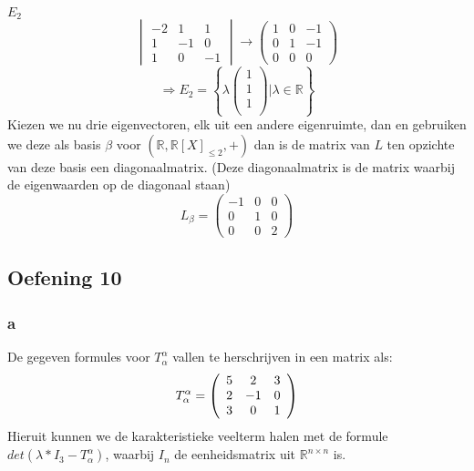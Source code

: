 \documentclass[lineaire_algebra_oplossingen.tex]{subfiles}
\begin{document}
\emph{$E_2$}\\
\[
\begin{vmatrix}
-2 & 1 & 1\\
1 & -1& 0\\
1 & 0 & -1
\end{vmatrix}
\rightarrow
\begin{pmatrix}
1 & 0 & -1\\
0 & 1 & -1\\
0 & 0 & 0
\end{pmatrix}
\]
\[
\Rightarrow E_2 = 
\left\{ 
\lambda
\begin{pmatrix}
1\\1\\1\\
\end{pmatrix}
| \lambda \in \mathbb{R}
\right\}
\]
Kiezen we nu drie eigenvectoren, elk uit een andere eigenruimte, dan en gebruiken we deze als basis $\beta$ voor $(\mathbb{R},\mathbb{R}[X]_{\le 2},+)$ dan is de matrix van $L$ ten opzichte van deze basis een diagonaalmatrix.
(Deze diagonaalmatrix is de matrix waarbij de eigenwaarden op de diagonaal staan)
\[
L_\beta = 
\begin{pmatrix}
-1 & 0 & 0\\
 0 & 1 & 0\\
 0 & 0 & 2
\end{pmatrix}
\]


\subsection{Oefening 10}

\subsubsection*{a}
De gegeven formules voor $T^\alpha_\alpha$ vallen te herschrijven in een matrix als:
\[
T^\alpha_\alpha = \left(
\begin{array}{c c c}
5 & 2 & 3 \\
2 & -1 & 0 \\
3 & 0 & 1 \\
\end{array}
\right)
\]
Hieruit kunnen we de karakteristieke veelterm halen met de formule $det(\lambda * I_3 - T^\alpha_\alpha)$, waarbij $I_n$ de eenheidsmatrix uit $\mathbb{R}^{n\times n}$ is.
\end{document}
